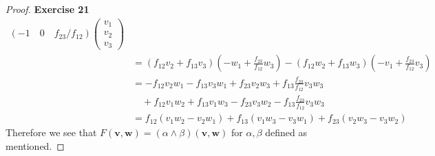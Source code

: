 \documentclass[11pt]{article}
\theoremstyle{definition}
\begin{document}
\begin{proof}{\textbf{Exercise 21}}
\begin{align*}
        (-1\quad 0\quad f_{23}/f_{12})
        \begin{pmatrix} v_1 \\ v_2 \\ v_3\end{pmatrix}\\
        &= (f_{12}v_2 + f_{13}v_3)\left(-w_1 + \frac{f_{23}}{f_{12}}w_3\right)
        - (f_{12}w_2 + f_{13}w_3)\left(-v_1 + \frac{f_{23}}{f_{12}}v_3\right)\\
        &= -f_{12}v_2w_1 - f_{13}v_3w_1 + f_{23}v_2w_3
        + f_{13}\frac{f_{23}}{f_{12}}v_3w_3\\
        &\quad + f_{12}v_1w_2 + f_{13}v_1w_3 - f_{23}v_3w_2
        - f_{13}\frac{f_{23}}{f_{12}}v_3w_3\\
        &= f_{12}(v_1w_2 -v_2w_1) + f_{13}(v_1w_3- v_3w_1)
        + f_{23}(v_2w_3 - v_3w_2)
    \end{align*}
    Therefore we see that $F(\bm{v}, \bm{w}) = (\alpha \wedge\beta)(\bm{v}, \bm{w})$
    for $\alpha, \beta$ defined as mentioned.
\end{proof}
\cleardoublepage
\end{document}
